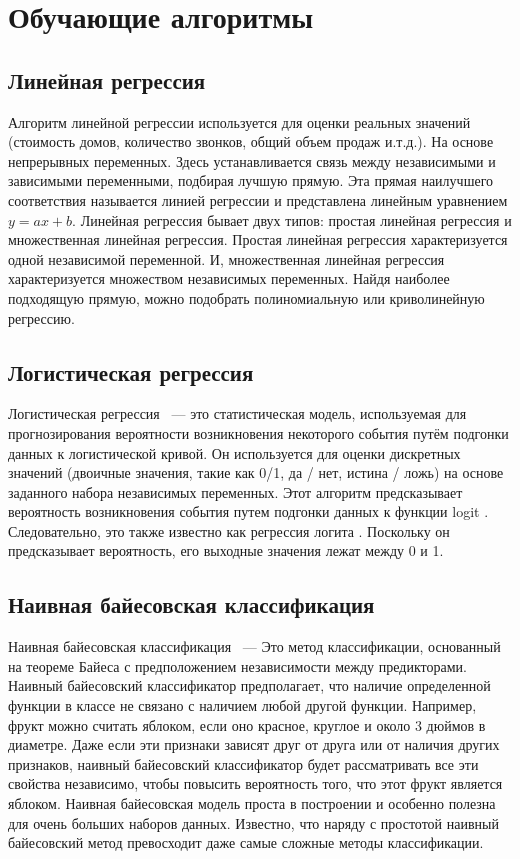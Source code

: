\section{Обучающие алгоритмы}

\subsection*{Линейная регрессия} 
\indent \indent Алгоритм линейной регрессии используется для оценки реальных значений (стоимость домов, количество звонков, общий объем продаж и.т.д.). На основе непрерывных переменных. Здесь устанавливается связь между независимыми и зависимыми переменными, подбирая лучшую прямую. Эта прямая наилучшего соответствия называется линией регрессии и представлена линейным уравнением $y = ax + b$.
Линейная регрессия бывает двух типов: простая линейная регрессия и множественная линейная регрессия. Простая линейная регрессия характеризуется одной независимой переменной. И, множественная линейная регрессия характеризуется множеством независимых переменных. Найдя наиболее подходящую прямую, можно подобрать полиномиальную или криволинейную регрессию. 

\subsection*{Логистическая регрессия} 
\indent \indent Логистическая регрессия ~--- это статистическая модель, используемая для прогнозирования вероятности возникновения некоторого события путём подгонки данных к логистической кривой. Он используется для оценки дискретных значений (двоичные значения, такие как 0/1, да / нет, истина / ложь) на основе заданного набора независимых переменных. Этот алгоритм предсказывает вероятность возникновения события путем подгонки данных к функции logit . Следовательно, это также известно как регрессия логита . Поскольку он предсказывает вероятность, его выходные значения лежат между 0 и 1.

\subsection*{Наивная байесовская классификация}
\indent \indent Наивная байесовская классификация ~--- Это метод классификации, основанный на  теореме Байеса с предположением независимости между предикторами. Наивный байесовский классификатор предполагает, что наличие определенной функции в классе не связано с наличием любой другой функции. Например, фрукт можно считать яблоком, если оно красное, круглое и около 3 дюймов в диаметре. Даже если эти признаки зависят друг от друга или от наличия других признаков, наивный байесовский классификатор будет рассматривать все эти свойства независимо, чтобы повысить вероятность того, что этот фрукт является яблоком.
Наивная байесовская модель проста в построении и особенно полезна для очень больших наборов данных. Известно, что наряду с простотой наивный байесовский метод превосходит даже самые сложные методы классификации.
